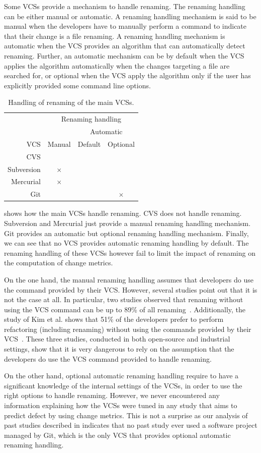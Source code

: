 Some VCSs provide a mechanism to handle renaming. The renaming handling can be either manual or automatic. A renaming handling mechanism is said to be manual when the developers have to manually perform a command to indicate that their change is a file renaming. A renaming handling mechanism is automatic when the VCS provides an algorithm that can automatically detect renaming. Further, an automatic mechanism can be by default when the VCS applies the algorithm automatically when the changes targeting a file are searched for, or optional when the VCS apply the algorithm only if the user has explicitly provided some command line options. 

\begin{table}[b]
\centering
\begin{tabular}{rccc}
\toprule
 & \multicolumn{3}{c}{Renaming handling}\\
\cmidrule{2-4}
& & \multicolumn{2}{c}{Automatic}\\
\cmidrule{3-4}
VCS & Manual & Default & Optional\\
\midrule
CVS & & &\\
Subversion & $\times$ & &\\
Mercurial & $\times$ & &\\
Git & & & $\times$\\
\bottomrule
\end{tabular}
\caption{Handling of renaming of the main VCSs.}
\label{tab:vcs}
\end{table}

 shows how the main VCSs handle renaming. CVS does not handle renaming. Subversion and Mercurial just provide a manual renaming handling mechanism. Git provides an automatic but optional renaming handling mechanism. Finally, we can see that no VCS provides automatic renaming handling by default. The renaming handling of these VCSs however fail to limit the impact of renaming on the computation of change metrics.

On the one hand, the manual renaming handling assumes that developers do use the command provided by their VCS. However, several studies point out that it is not the case at all. In particular, two studies observed that renaming without using the VCS command can be up to 89\% of all renaming~\cite{lavoie_inferring_2012,steidl_incremental_2014}. Additionally, the study of Kim et al. shows that 51\% of the developers prefer to perform refactoring (including renaming) without using the commands provided by their VCS~\cite{kim_field_2012}. These three studies, conducted in both open-source and industrial settings, show that it is very dangerous to rely on the assumption that the developers do use the VCS command provided to handle renaming.

On the other hand, optional automatic renaming handling require to have a significant knowledge of the internal settings of the VCSs, in order to use the right options to handle renaming. However, we never encountered any information explaining how the VCSs were tuned in any study that aims to predict defect by using change metrics. This is not a surprise as our analysis of past studies described in  indicates that no past study ever used a software project managed by Git, which is the only VCS that provides optional automatic renaming handling.
